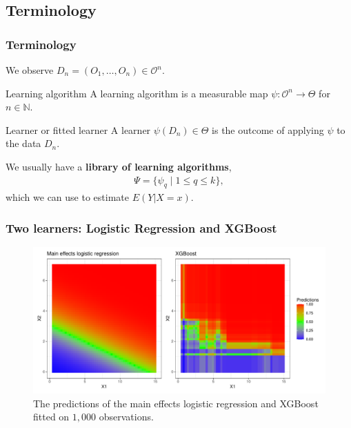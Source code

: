 \documentclass{beamer}
\newcommand{\q}{q}
\newcommand{\ml}{k}
\newcommand{\la}{\psi}
\newcommand{\lib}{\Psi}
\begin{document}
\subsection{Terminology}
\begin{frame}
    \frametitle{Terminology}
    We observe $ D_n = (O_1 , \dots , O_n) \in \mathcal{O}^{n}$. %
    \begin{block}{Learning algorithm}
        A learning algorithm is a measurable map $ \la : \mathcal{O}^{n} \to \Theta $ for $ n \in \mathbb{N} $. 
      \end{block}
      \vfill
    \begin{block}{Learner or fitted learner}
        A learner  $ \la(D_n)\in \Theta$ is the outcome of applying $ \la $ to the data $ D_n $.
      \end{block}
      \vfill
    We usually have a \textbf{library of learning algorithms}, 
    \begin{align*}
        \lib = \{\la_{\q} \mid 1 \leq \q \leq\ml \},
    \end{align*}
    which we can use to estimate \(E(Y|X=x)\).
\end{frame}

\begin{frame}
    \frametitle{Two learners: Logistic Regression and XGBoost} 
    \begin{figure}
        \centering
        \centerline{\includegraphics[width=1.1\textwidth]{figures/predictpar.pdf}}
        \caption{The predictions of the main effects logistic regression and XGBoost fitted on $ 1,000 $ observations.}
        \label{fig:predictpar}
    \end{figure}
\end{frame}
\end{document}

